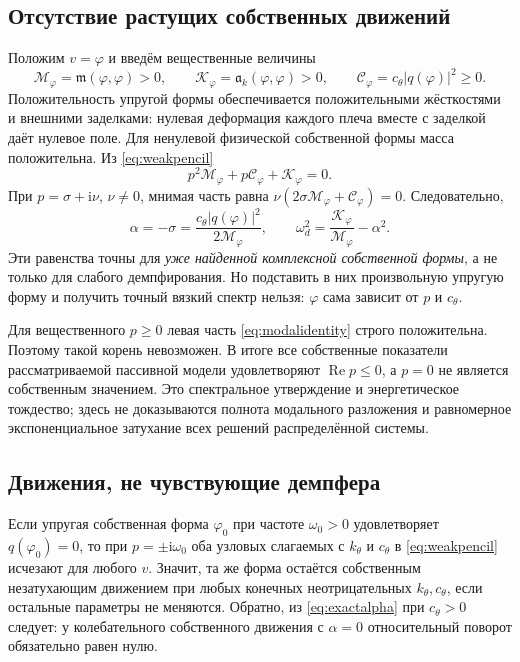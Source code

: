\documentclass[11pt,a4paper]{article}
\numberwithin{equation}{section}
\newcommand{\ii}{\mathrm i}
\newcommand{\kth}{k_\theta}
\newcommand{\cth}{c_\theta}
\newcommand{\abs}[1]{\left|#1\right|}
\begin{document}
\subsection{Отсутствие растущих собственных движений}

Положим $v=\varphi$ и введём вещественные величины
\[
 \mathcal M_\varphi=\mathfrak m(\varphi,\varphi)>0,\qquad
 \mathcal K_\varphi=\mathfrak a_k(\varphi,\varphi)>0,\qquad
 \mathcal C_\varphi=\cth\abs{q(\varphi)}^2\ge0.
\]
Положительность упругой формы обеспечивается положительными жёсткостями
и внешними заделками: нулевая деформация каждого плеча вместе с заделкой
даёт нулевое поле. Для ненулевой физической собственной формы масса
положительна. Из \eqref{eq:weakpencil}
\begin{equation}
 p^2\mathcal M_\varphi+p\mathcal C_\varphi+\mathcal K_\varphi=0.
 \label{eq:modalidentity}
\end{equation}
При $p=\sigma+\ii\nu$, $\nu\ne0$, мнимая часть равна
$\nu(2\sigma\mathcal M_\varphi+\mathcal C_\varphi)=0$. Следовательно,
\begin{equation}
 \boxed{\alpha=-\sigma=
 \frac{\cth\abs{q(\varphi)}^2}{2\mathcal M_\varphi},\qquad
 \omega_d^2=\frac{\mathcal K_\varphi}{\mathcal M_\varphi}-\alpha^2.}
 \label{eq:exactalpha}
\end{equation}
Эти равенства точны для \emph{уже найденной комплексной собственной формы},
а не только для слабого демпфирования. Но подставить в них произвольную
упругую форму и получить точный вязкий спектр нельзя: $\varphi$ сама
зависит от $p$ и $\cth$.

Для вещественного $p\ge0$ левая часть \eqref{eq:modalidentity} строго
положительна. Поэтому такой корень невозможен. В итоге все собственные
показатели рассматриваемой пассивной модели удовлетворяют
$\operatorname{Re}p\le0$, а $p=0$ не является собственным значением.
Это спектральное утверждение и энергетическое тождество; здесь не
доказываются полнота модального разложения и равномерное экспоненциальное
затухание всех решений распределённой системы.

\subsection{Движения, не чувствующие демпфера}

Если упругая собственная форма $\varphi_0$ при частоте $\omega_0>0$
удовлетворяет $q(\varphi_0)=0$, то при $p=\pm\ii\omega_0$ оба узловых
слагаемых с $\kth$ и $\cth$ в \eqref{eq:weakpencil} исчезают для любого $v$.
Значит, та же форма остаётся собственным незатухающим движением при
любых конечных неотрицательных $\kth,\cth$, если остальные параметры
не меняются. Обратно, из \eqref{eq:exactalpha} при $\cth>0$ следует:
у колебательного собственного движения с $\alpha=0$ относительный
поворот обязательно равен нулю.
\end{document}
